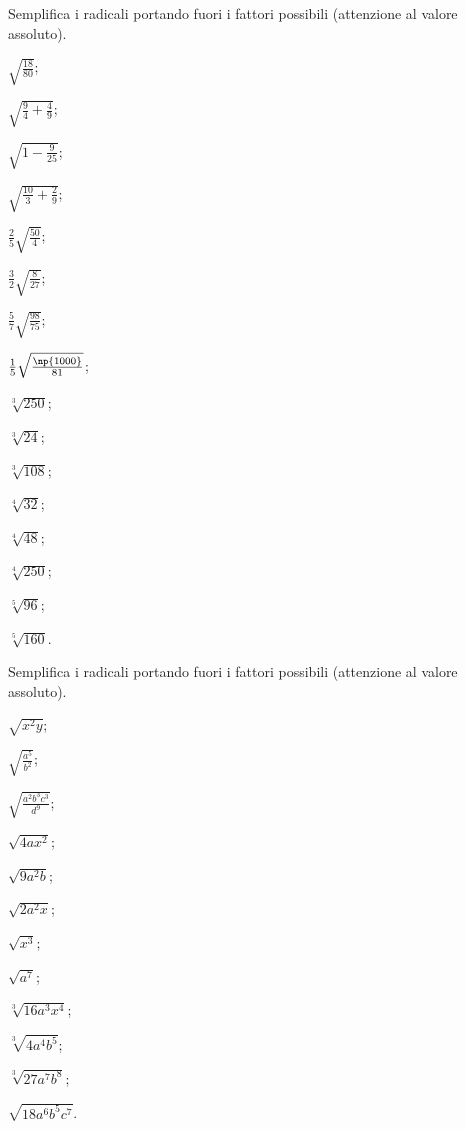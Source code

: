 \begin{esercizio}[\Ast]
 \label{ese:2.54}
Semplifica i radicali portando fuori i fattori possibili (attenzione al valore assoluto).
 \begin{multicols}{3}
 \begin{enumeratea}
 \item $\sqrt{\frac{18}{80}}$;
 \item $\sqrt{\frac 9 4+\frac 4 9}$;
 \item $\sqrt{1-\frac 9{25}}$;
 \item $\sqrt{\frac{10} 3+\frac 2 9}$;
 \item $\frac 2 5\sqrt{\frac{50} 4}$;
 \item $\frac 3 2\sqrt{\frac 8{27}}$;
 \item $\frac 5 7\sqrt{\frac{98}{75}}$;
 \item $\frac 1 5\sqrt{\frac{\np{1000}}{81}}$;
 \item $\sqrt[3]{250}$;
 \item $\sqrt[3]{24}$;
 \item $\sqrt[3]{108}$;
 \item $\sqrt[4]{32}$;
 \item $\sqrt[4]{48}$;
 \item $\sqrt[4]{250}$;
 \item $\sqrt[5]{96}$;
 \item $\sqrt[5]{160}$.
 \end{enumeratea}
 \end{multicols}
\end{esercizio}
\pagebreak
\begin{esercizio}[\Ast]
 \label{ese:2.55}
Semplifica i radicali portando fuori i fattori possibili (attenzione al valore assoluto).
 \begin{multicols}{3}
 \begin{enumeratea}
 \item $\sqrt{x^2y}$;
 \item $\sqrt{\frac{a^5}{b^2}}$;
 \item $\sqrt{\frac{a^2b^3c^3}{d^9}}$;
 \item $\sqrt{4ax^2}$;
 \item $\sqrt{9a^2b}$;
 \item $\sqrt{2a^2x}$;
 \item $\sqrt{x^3}$;
 \item $\sqrt{a^7}$;
 \item $\sqrt[3]{16a^3x^4}$;
 \item $\sqrt[3]{4a^4b^5}$;
 \item $\sqrt[3]{27a^7b^8}$;
 \item $\sqrt{18a^6b^5c^7}$.
 \end{enumeratea}
 \end{multicols}
\end{esercizio}

